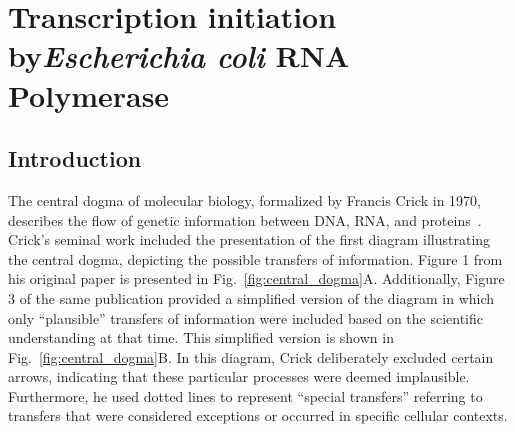 \chapter{Transcription initiation by\textit{Escherichia coli} RNA Polymerase}
\label{chpt:RNAP}

\section{Introduction}
\label{sec:rnap_intro}

The central dogma of molecular biology, formalized by Francis Crick in 1970, describes the flow of genetic information between DNA, RNA, and proteins~\cite{crick_central}. 
Crick's seminal work included the presentation of the first diagram illustrating the central dogma, depicting the possible transfers of information.
Figure 1 from his original paper is presented in Fig.~\ref{fig:central_dogma}A. 
Additionally, Figure 3 of the same publication provided a simplified version of the diagram in which only \enquote{plausible} transfers of information were included based on the scientific understanding at that time. 
This simplified version is shown in Fig.~\ref{fig:central_dogma}B.
In this diagram, Crick deliberately excluded certain arrows, indicating that these particular processes were deemed implausible. 
Furthermore, he used dotted lines to represent \enquote{special transfers} referring to transfers that were considered exceptions or occurred in specific cellular contexts.

